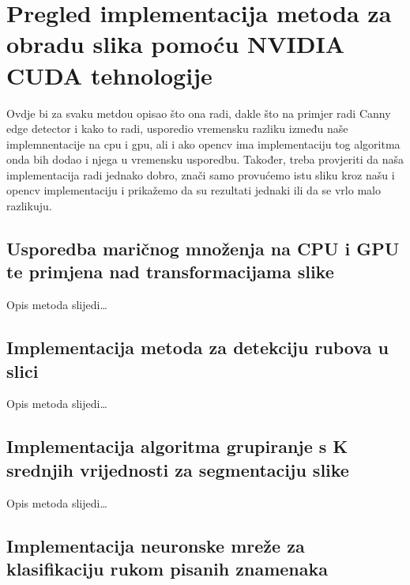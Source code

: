 \documentclass[a4paper,twocolumn]{article}
\begin{document}
	\section{Pregled implementacija metoda za obradu slika pomoću NVIDIA CUDA tehnologije}
	Ovdje bi za svaku metdou opisao što ona radi, dakle što na primjer radi Canny edge detector i kako to radi, usporedio vremensku razliku između naše implemnentacije na cpu i gpu, ali i ako opencv ima implementaciju tog algoritma onda bih dodao i njega u vremensku usporedbu. Također, treba provjeriti da naša implementacija radi jednako dobro, znači samo provućemo istu sliku kroz našu i opencv implementaciju i prikažemo da su rezultati jednaki ili da se vrlo malo razlikuju. 
	
	
	\subsection{Usporedba maričnog množenja na CPU i GPU te primjena nad transformacijama slike}
	
	Opis metoda slijedi\dots
	
	\subsection{Implementacija metoda za detekciju rubova u slici}
	
	Opis metoda slijedi\dots
	
	\subsection{Implementacija algoritma grupiranje s K srednjih vrijednosti za segmentaciju slike}
	
	Opis metoda slijedi\dots
	
	\subsection{Implementacija neuronske mreže za klasifikaciju rukom pisanih znamenaka}
	
\end{document}
